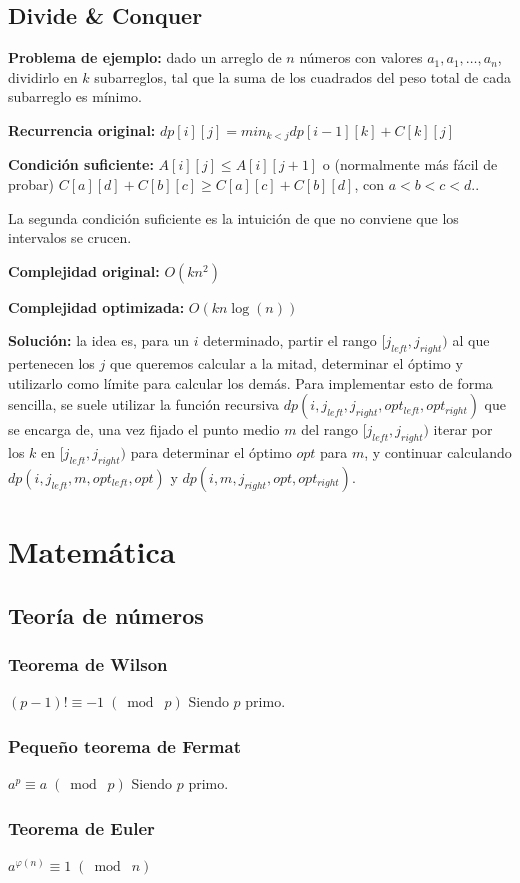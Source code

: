\subsection{Divide \& Conquer}
{
    \textbf{Problema de ejemplo:} dado un arreglo de $n$ números con valores $a_1, a_1, \dots, a_n$, dividirlo
    en $k$ subarreglos, tal que la suma de los cuadrados del peso total de cada subarreglo es mínimo.

    \textbf{Recurrencia original:} $dp[i][j] = min_{k < j}{dp[i - 1][k] + C[k][j]}$ 

    \textbf{Condición suficiente:} $ A[i][j] \leq A[i][j + 1] $ o (normalmente más fácil de probar) 
    $ C[a][d] + C[b][c] \geq C[a][c] + C[b][d]$, con $a < b < c < d. $.

    La segunda condición suficiente es la intuición de que no conviene que los intervalos se crucen.

    \textbf{Complejidad original:} $O(kn^2)$

    \textbf{Complejidad optimizada:} $O(kn\log(n))$

    \textbf{Solución:} la idea es, para un $i$ determinado, partir el rango $[j_{left}, j_{right})$ al que pertenecen 
    los $j$ que queremos calcular a la mitad, determinar el óptimo y utilizarlo como límite para calcular los demás.
    Para implementar esto de forma sencilla, se suele utilizar la función recursiva $dp(i, j_{left}, j_{right}, opt_{left}, opt_{right})$
    que se encarga de, una vez fijado el punto medio $m$ del rango $[j_{left}, j_{right})$ iterar por los $k$ en $[j_{left}, j_{right})$ 
    para determinar el óptimo $opt$ para $m$, y continuar calculando $dp(i, j_{left}, m, opt_{left}, opt)$ y 
    $dp(i, m, j_{right}, opt, opt_{right})$.
}


\section{Matemática}%
\subsection{Teoría de números}
{
\subsubsection{Teorema de Wilson}
{
\(\displaystyle (p-1)! \equiv -1 \;(\bmod\; p) \)
Siendo $p$ primo.
}
\subsubsection{Pequeño teorema de Fermat}
{
\(\displaystyle a^p \equiv a \;(\bmod\; p) \)
Siendo $p$ primo.
}
\subsubsection{Teorema de Euler}
{
\(\displaystyle a^{\varphi(n)} \equiv 1 \;(\bmod\; n) \)
}
}
